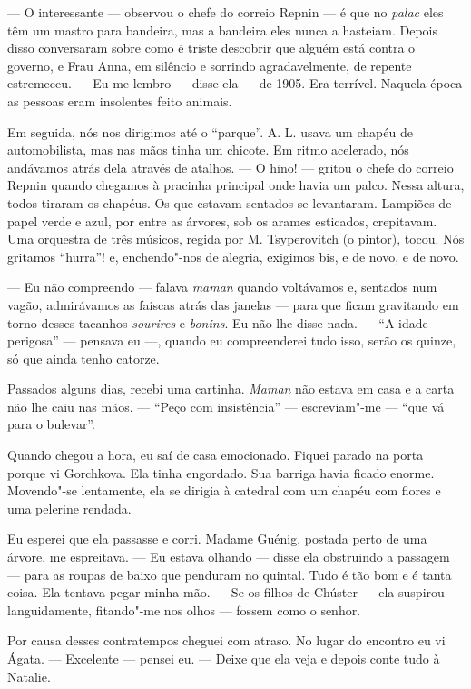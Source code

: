 --- O interessante --- observou o chefe do correio Repnin --- é que no
\emph{palac} eles têm um mastro para bandeira, mas a bandeira eles nunca
a hasteiam. Depois disso conversaram sobre como é triste descobrir que
alguém está contra o governo, e Frau Anna, em silêncio e sorrindo
agradavelmente, de repente estremeceu. --- Eu me lembro --- disse ela
--- de 1905. Era terrível. Naquela época as pessoas eram insolentes
feito animais.

Em seguida, nós nos dirigimos até o ``parque''. A. L. usava um chapéu de
automobilista, mas nas mãos tinha um chicote. Em ritmo acelerado, nós
andávamos atrás dela através de atalhos. --- O hino! --- gritou o chefe
do correio Repnin quando chegamos à pracinha principal onde havia um
palco. Nessa altura, todos tiraram os chapéus. Os que estavam sentados
se levantaram. Lampiões de papel verde e azul, por entre as árvores, sob
os arames esticados, crepitavam. Uma orquestra de três músicos, regida
por M. Tsyperovitch (o pintor), tocou. Nós gritamos ``hurra''! e,
enchendo"-nos de alegria, exigimos bis, e de novo, e de novo.

--- Eu não compreendo --- falava \emph{maman} quando voltávamos e,
sentados num vagão, admirávamos as faíscas atrás das janelas --- para
que ficam gravitando em torno desses tacanhos \emph{sourires} e
\emph{bonins}. Eu não lhe disse nada. --- ``A idade perigosa'' ---
pensava eu ---, quando eu compreenderei tudo isso, serão os quinze, só
que ainda tenho catorze.

Passados alguns dias, recebi uma cartinha. \emph{Maman} não estava em
casa e a carta não lhe caiu nas mãos. --- ``Peço com insistência'' ---
escreviam"-me --- ``que vá para o bulevar''.

Quando chegou a hora, eu saí de casa emocionado. Fiquei parado na porta
porque vi Gorchkova. Ela tinha engordado. Sua barriga havia ficado
enorme. Movendo"-se lentamente, ela se dirigia à catedral com um chapéu
com flores e uma pelerine rendada.

Eu esperei que ela passasse e corri. Madame Guénig, postada perto de uma
árvore, me espreitava. --- Eu estava olhando --- disse ela obstruindo a
passagem --- para as roupas de baixo que penduram no quintal. Tudo é tão
bom e é tanta coisa. Ela tentava pegar minha mão. --- Se os filhos de
Chúster --- ela suspirou languidamente, fitando"-me nos olhos --- fossem
como o senhor.

Por causa desses contratempos cheguei com atraso. No lugar do encontro
eu vi Ágata. --- Excelente --- pensei eu. --- Deixe que ela veja e
depois conte tudo à Natalie.


